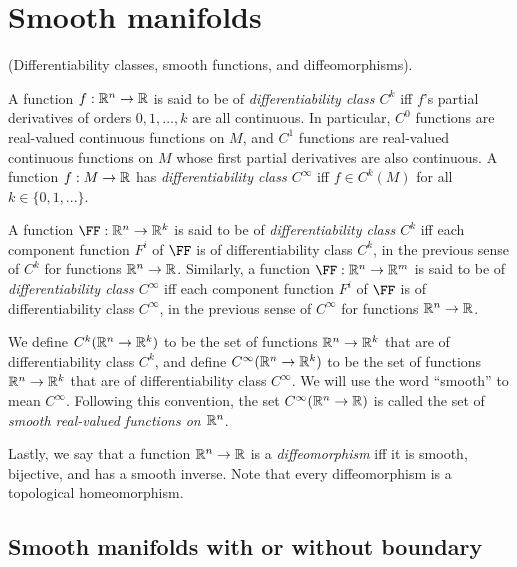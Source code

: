 \newpage

\section{Smooth manifolds}

\begin{defn}
     (Differentiability classes, smooth functions, and diffeomorphisms).

    A function $f:\mathbb{R}^n \rightarrow \mathbb{R}$ is said to be of \textit{differentiability class $C^k$} iff $f$'s partial derivatives of orders $0, 1, ..., k$ are all continuous. In particular, $C^0$ functions are real-valued continuous functions on $M$, and $C^1$ functions are real-valued continuous functions on $M$ whose first partial derivatives are also continuous. A function $f:M \rightarrow \mathbb{R}$ has \textit{differentiability class $C^\infty$} iff $f \in C^k(M)$ for all $k \in \{0, 1, ...\}$.
    
    A function $\FF:\R^n \rightarrow \R^k$ is said to be of \textit{differentiability class $C^k$} iff each component function $F^i$ of $\FF$ is of differentiability class $C^k$, in the previous sense of $C^k$ for functions $\mathbb{R}^n \rightarrow \mathbb{R}$. Similarly, a function $\FF:\R^n \rightarrow \R^m$ is said to be of \textit{differentiability class $C^\infty$} iff each component function $F^i$ of $\FF$ is of differentiability class $C^\infty$, in the previous sense of $C^\infty$ for functions $\mathbb{R}^n \rightarrow \mathbb{R}$.
    
    We define $C^k(\mathbb{R}^n \rightarrow \mathbb{R}^k)$ to be the set of functions $\mathbb{R}^n \rightarrow \mathbb{R}^k$ that are of differentiability class $C^k$, and define $C^\infty(\mathbb{R}^n \rightarrow \mathbb{R}^k)$ to be the set of functions $\mathbb{R}^n \rightarrow \mathbb{R}^k$ that are of differentiability class $C^\infty$. We will use the word ``smooth'' to mean $C^\infty$. Following this convention, the set ${C^\infty(\mathbb{R}^n \rightarrow \mathbb{R})}$ is called the set of \textit{smooth real-valued functions on $\mathbb{R}^n$}.
    
    Lastly, we say that a function $\mathbb{R}^n \rightarrow \mathbb{R}$ is a \textit{diffeomorphism} iff it is smooth, bijective, and has a smooth inverse. Note that every diffeomorphism is a topological homeomorphism.
\end{defn}

\subsection*{Smooth manifolds with or without boundary}

